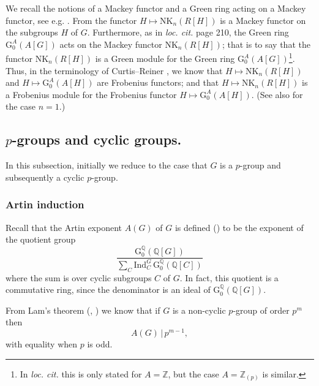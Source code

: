 \documentclass[reqno,11pt,letterpaper]{amsart}
\theoremstyle{plain}
\numberwithin{equation}{subsection}
\theoremstyle{remark}
\theoremstyle{plain}
\theoremstyle{definition}\newtheorem*{notation}{Notation}
\newcommand{\Q}{{\mathbb Q}}
\newcommand{\RG}{\mathrm{G}}
\newcommand{\RNK}{\mathrm{NK}}
\newcommand{\BZ}{\mathbb{Z}}
\begin{document}
 
 
 
 We recall the notions of a Mackey functor and a Green ring acting on a Mackey
functor, see  e.g. \cite[p. 246]{Ol88}.
From   \cite[p. 200]{HLuck}  the functor $H\mapsto \RNK_{n}( R[ H]
) $ is a Mackey functor on the subgroups $H$ of $G$.  Furthermore, as in \emph{loc. cit.} page 210,
  the Green ring $\RG^A_0(A[G])$ acts on the Mackey functor $\RNK_{n}(R[H])$; that is to say that the 
 functor $\RNK_{n}(R[H])$ is a Green module for the Green ring  $\RG^A_0(A[G])$\footnote{In   \emph{loc. cit.} this is only stated for $A=\BZ$, but the case $A=\BZ_{(p)}$ is similar.}. Thus, in the terminology of Curtis--Reiner  \cite[\S 38.1, \S 38.7]{CR94}, 
we know that $H\mapsto \RNK_{n}(R[H])$ and $
H\mapsto  \RG^A_0(A[H])$ are Frobenius functors; and that $H\mapsto \RNK_{n}( R[ H] ) $ is
a Frobenius module for the Frobenius functor $H\mapsto \RG^A_0(A[H])$.
(See also  \cite[Cor. 2]{Harmon} for the case $n=1$.)


 

\subsection{$p$-groups and cyclic groups.}

 
  In  this subsection, initially we reduce to the case that $G$ is a $p$-group and subsequently a cyclic $p$-group.
  


\subsubsection{Artin induction}

  

Recall that the Artin exponent $A(G)$ of 
$G$ is defined (\cite{Lam}) to be the exponent of the quotient group 
\begin{equation*}
\frac{\RG_{0}^\Q( \mathbb{Q}[ G] ) }{\sum_{C}
\mathrm{Ind}_{C}^{G}\,\RG^\Q_{0}( \mathbb{Q}[ C] ) }
\end{equation*} 
where the sum is over cyclic subgroups $C$ of $G$.
In fact, this quotient is   a commutative ring, since the denominator is an ideal of $ 
\RG^\Q_{0}( \mathbb{Q}[ G] )$. 

From Lam's theorem (\cite{Lam}, \cite[Theorem 76.15]{CR94})  we know that
if $G$ is a non-cyclic $p$-group of order $p^{m}$ then 
\begin{equation}\label{ArtinExpValue}
A( G)\, |\, p^{m-1},
\end{equation}
with equality when $p$ is odd. 
\end{document}
